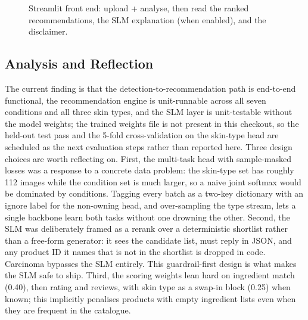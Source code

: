 \documentclass[11pt,a4paper]{article}
\begin{document}
\begin{figure}[!ht]
  \centering
  \caption{Streamlit front end: upload + analyse, then read the ranked
           recommendations, the SLM explanation (when enabled), and the
           disclaimer.}
  \label{fig:ui}
\end{figure}

\subsection{Analysis and Reflection}

The current finding is that the detection-to-recommendation path is
end-to-end functional, the recommendation engine is unit-runnable
across all seven conditions and all three skin types, and the SLM
layer is unit-testable without the model weights; the trained weights
file is not present in this checkout, so the held-out test pass and
the 5-fold cross-validation on the skin-type head are scheduled as the
next evaluation steps rather than reported here. Three design choices
are worth reflecting on. First, the multi-task head with sample-masked
losses was a response to a concrete data problem: the skin-type set
has roughly 112 images while the condition set is much larger, so a
naive joint softmax would be dominated by conditions. Tagging every
batch as a two-key dictionary with an ignore label for the non-owning
head, and over-sampling the type stream, lets a single backbone learn
both tasks without one drowning the other. Second, the SLM was
deliberately framed as a rerank over a deterministic shortlist rather
than a free-form generator: it sees the candidate list, must reply in
JSON, and any product ID it names that is not in the shortlist is
dropped in code. Carcinoma bypasses the SLM entirely. This
guardrail-first design is what makes the SLM safe to ship. Third, the
scoring weights lean hard on ingredient match (0.40), then rating and
reviews, with skin type as a swap-in block (0.25) when known; this
implicitly penalises products with empty ingredient lists even when
they are frequent in the catalogue.
\end{document}
